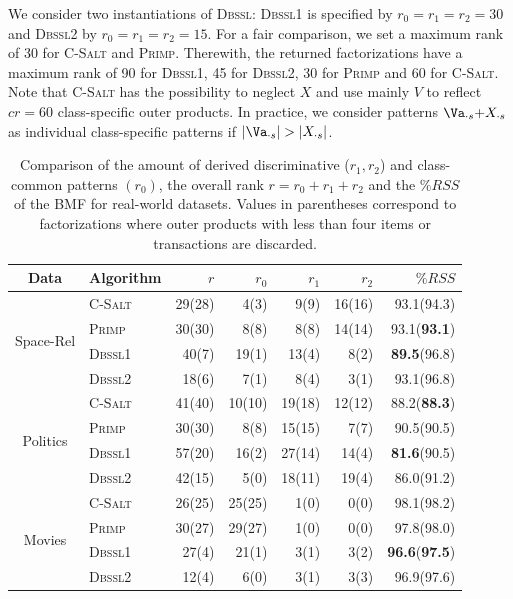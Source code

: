 We consider two instantiations of \textsc{Dbssl}: \textsc{Dbssl1} is specified by $r_0=r_1=r_2=30$ and \textsc{Dbssl2} by $r_0=r_1=r_2=15$. For a fair comparison, we set a maximum rank of 30 for \textsc{C-Salt} and \textsc{Primp}. Therewith, the returned factorizations have a maximum rank of 90 for \textsc{Dbssl1}, 45 for \textsc{Dbssl2}, 30 for \textsc{Primp} and 60 for \textsc{C-Salt}. Note that \textsc{C-Salt} has the possibility to neglect $X$ and use mainly $V$ to reflect $cr=60$ class-specific outer products. In practice, we consider patterns $\Va_{\cdot s}{+}X_{\cdot s}$ as individual class-specific patterns if $\lvert \Va_{\cdot s}\rvert >\lvert X_{\cdot  s}\rvert $.
\begin{table}%
	\centering
	\begin{tabular}{clrrrrr}\toprule
    Data & Algorithm & $r$ & $r_0$ & $r_1$ & $r_2$  & $\%RSS$  \\ \midrule
\multirow{4}{*}{Space-Rel} 
 & \textsc{C-Salt} & 29(28) & 4(3) & 9(9) & 16(16) & 93.1(94.3)\\
 & \textsc{Primp} & 30(30) & 8(8) & 8(8) & 14(14) & 93.1(\textbf{93.1})\\
 & \textsc{Dbssl1} & 40(7) & 19(1) & 13(4) & 8(2) & \textbf{89.5}(96.8)\\ 
 & \textsc{Dbssl2} & 18(6) & 7(1) & 8(4) & 3(1) & 93.1(96.8)\\
 \midrule
\multirow{4}{*}{Politics} 
 & \textsc{C-Salt} & 41(40) & 10(10) & 19(18) & 12(12) & 88.2(\textbf{88.3})\\
 & \textsc{Primp} & 30(30) & 8(8) & 15(15) & 7(7) & 90.5(90.5)\\ 
 & \textsc{Dbssl1} & 57(20) & 16(2) & 27(14) & 14(4) & \textbf{81.6}(90.5)\\
 & \textsc{Dbssl2} & 42(15) & 5(0) & 18(11) & 19(4) & 86.0(91.2)\\
 \midrule
\multirow{4}{*}{Movies}
 & \textsc{C-Salt} & 26(25) & 25(25) & 1(0) & 0(0) & 98.1(98.2)\\
 & \textsc{Primp} & 30(27) & 29(27) & 1(0) & 0(0) & 97.8(98.0)\\
 & \textsc{Dbssl1} & 27(4) & 21(1) & 3(1) & 3(2) & \textbf{96.6}(\textbf{97.5})\\
 & \textsc{Dbssl2} & 12(4) & 6(0) & 3(1) & 3(3) & 96.9(97.6)\\ 
 \bottomrule
    \end{tabular}
    \caption{Comparison of the amount of derived discriminative ($r_1,r_2$) and class-common patterns $(r_0)$, the overall rank $r=r_0+r_1+r_2$ and the $\%RSS$ of the BMF for real-world datasets. Values in parentheses correspond to factorizations where outer products with less than four items or transactions are discarded.}
  \label{tbl:CS:realWorld}
\end{table}

